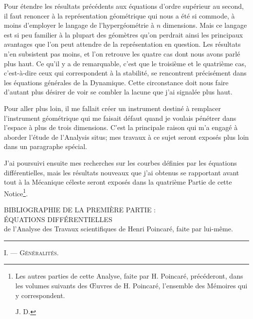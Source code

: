 \documentclass[11pt]{article}
\newcommand{\shortline}{\begin{center}\rule{3.5em}{0.4pt}\end{center}}
\begin{document}
Pour étendre les résultats précédents aux équations d’ordre supérieur au second, il faut renoncer à la représentation géométrique qui nous a été si commode, à moins d’employer le langage de l’hypergéométrie à $n$ dimensions. Mais ce langage est si peu familier à la plupart des géomètres qu’on perdrait ainsi les principaux avantages que l’on peut attendre de la représentation en question. Les résultats n’en subsistent pas moins, et l’on retrouve les quatre cas dont nous avons parlé plus haut. Ce qu’il y a de remarquable, c’est que le troisième et le quatrième cas, c’est-à-dire ceux qui correspondent à la stabilité, se rencontrent précisément dans les équations générales de la Dynamique. Cette circonstance doit nous faire d’autant plus désirer de voir se combler la lacune que j’ai signalée plus haut.

Pour aller plus loin, il me fallait créer un instrument destiné à remplacer l’instrument géométrique qui me faisait défaut quand je voulais pénétrer dans l’espace à plus de trois dimensions. C’est la principale raison qui m’a engagé à aborder l’étude de l’Analysis situs; mes travaux à ce sujet seront exposés plus loin dans un paragraphe spécial.

J’ai poursuivi ensuite mes recherches sur les courbes définies par les équations différentielles, mais les résultats nouveaux que j’ai obtenus se rapportant avant tout à la Mécanique céleste seront exposés dans la quatrième Partie de cette Notice\footnote[1]{Les autres parties de cette Analyse, faite par H. Poincaré, précéderont, dans les volumes suivants des Œuvres de H. Poincaré, l’ensemble des Mémoires qui y correspondent.\par\hfill J. D.}.



\clearpage
\begin{center}
{\large BIBLIOGRAPHIE DE LA PREMIÈRE PARTIE :}\\[1em]
{\Large ÉQUATIONS DIFFÉRENTIELLES}\\[1em]
{de l’Analyse des Travaux scientifiques de Henri Poincaré, faite par lui-même.}
\end{center}
\shortline

\begin{center}
{\scshape I. — Généralités.}
\end{center}
\end{document}
